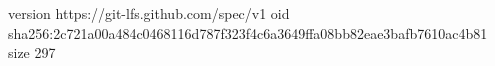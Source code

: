version https://git-lfs.github.com/spec/v1
oid sha256:2c721a00a484c0468116d787f323f4c6a3649ffa08bb82eae3bafb7610ac4b81
size 297

